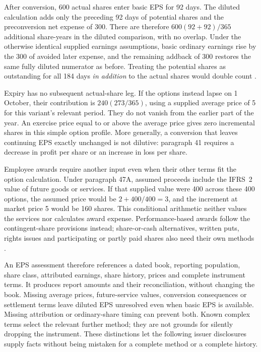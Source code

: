 After conversion, 600 actual shares enter basic EPS for 92 days.
The diluted calculation adds only the preceding 92 days of potential
shares and the preconversion net expense of 300. There are therefore
$600(92+92)/365$ additional share-years in the diluted comparison, with
no overlap. Under the otherwise identical supplied earnings assumptions,
basic ordinary earnings rise by the 300 of avoided later expense, and
the remaining addback of 300 restores the same fully diluted numerator
as before. Treating the potential shares as outstanding for all 184 days
\emph{in addition} to the actual shares would double count
\citep[IAS~33, paragraphs 21(c), 36--38]{eu20231803}.

Expiry has no subsequent actual-share leg. If the options instead lapse
on 1 October, their contribution is $240(273/365)$, using a supplied
average price of 5 for this variant's relevant period. They do not vanish
from the earlier part of the year. An exercise price equal to or above
the average price gives zero incremental shares in this simple option
profile. More generally, a conversion that leaves continuing EPS exactly
unchanged is not dilutive: paragraph 41 requires a decrease in profit
per share or an increase in loss per share.

Employee awards require another input even when their other terms fit
the option calculation. Under paragraph 47A, assumed proceeds include
the IFRS~2 value of future goods or services. If that supplied value were
400 across these 400 options, the assumed price would be
$2+400/400=3$, and the increment at market price 5 would be 160 shares.
This conditional arithmetic neither values the services nor calculates
award expense. Performance-based awards follow the contingent-share
provisions instead; share-or-cash alternatives, written puts, rights
issues and participating or partly paid shares also need their own
methods \citep[IAS~33, paragraphs 47A--63, A2 and A13--A16]{eu20231803}.

An EPS assessment therefore references a dated book, reporting population,
share class, attributed earnings, share history, prices and complete
instrument terms. It produces report amounts and their reconciliation,
without changing the book. Missing average prices, future-service values,
conversion consequences or settlement terms leave diluted EPS unresolved
even when basic EPS is available. Missing attribution or ordinary-share
timing can prevent both. Known complex terms select the relevant further
method; they are not grounds for silently dropping the instrument.
These distinctions let the following issuer disclosures supply facts
without being mistaken for a complete method or a complete history.
